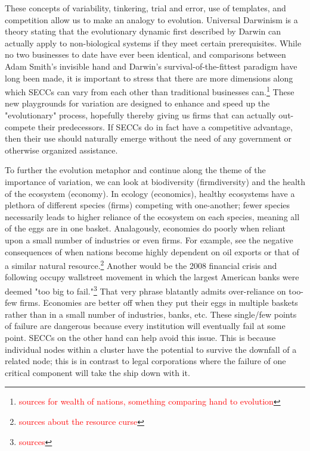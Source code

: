 \documentclass{article}[10pt]
\begin{document}
These concepts of variability, tinkering, trial and error, use of templates, and competition allow us to make an analogy to evolution.
Universal Darwinism is a theory stating that the evolutionary dynamic first described by Darwin can actually apply to non-biological systems if they meet certain prerequisites.\autocites{UniDarwinism1, UniDarwinism2}
While no two businesses to date have ever been identical, and comparisons between Adam Smith's invisible hand and Darwin's survival-of-the-fittest paradigm have long been made, it is important to stress that there are more dimensions along which SECCs can vary from each other than traditional businesses can.\footnote{
    \textcolor{red}{sources for wealth of nations, something comparing hand to evolution}}
These new playgrounds for variation are designed to enhance and speed up the "evolutionary" process, hopefully thereby giving us firms that can actually out-compete their predecessors.
If SECCs do in fact have a competitive advantage, then their use should naturally emerge without the need of any government or otherwise organized assistance.\par

To further the evolution metaphor and continue along the theme of the importance of variation, we can look at biodiversity (firmdiversity) and the health of the ecosystem (economy).
In ecology (economics), healthy ecosystems have a plethora of different species (firms) competing with one-another; fewer species necessarily leads to higher reliance of the ecosystem on each species, meaning all of the eggs are in one basket.
Analagously, economies do poorly when reliant upon a small number of industries or even firms.
For example, see the negative consequences of when nations become highly dependent on oil exports or that of a similar natural resource.\footnote{
    \textcolor{red}{sources about the resource curse}}
Another would be the 2008 financial crisis and following occupy wallstreet movement in which the largest American banks were deemed "too big to fail."\footnote{
    \textcolor{red}{sources}}
That very phrase blatantly admits over-reliance on too-few firms.
Economies are better off when they put their eggs in multiple baskets rather than in a small number of industries, banks, etc.
These single/few points of failure are dangerous because every institution will eventually fail at some point.
SECCs on the other hand can help avoid this issue.
This is because individual nodes within a cluster have the potential to survive the downfall of a related node; this is in contrast to legal corporations where the failure of one critical component will take the ship down with it.
\end{document}
